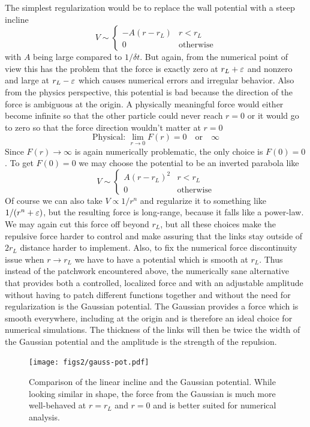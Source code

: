 \documentclass[endfloats,nofootinbib,preprint,floatfix,titlepage,superscriptaddress,linenumbers]{revtex4-1} %
\begin{document}
The simplest regularization would be to replace the wall potential with a steep incline
\[V \sim \begin{cases} -A(r -r_L) & r< r_L \\
0 & \mbox{otherwise} 
\end{cases}\]
with $A$ being large compared to $1/\delta t$. 
But again, from the numerical point of view this has the problem that the force is exactly zero at $r_L+\varepsilon$ and nonzero and large at $r_L - \varepsilon$ which causes numerical errors and irregular behavior. Also from the physics perspective, this potential is bad because the direction of the force is ambiguous at the origin. A physically meaningful force would either become infinite so that the other particle could never reach $r=0$ or it would go to zero so that the force direction wouldn't matter at $r=0$
\[\mbox{Physical: } \lim_{r\to 0} F(r) = 0 \quad \mbox{or}\quad \infty \]
Since $F(r)\to \infty$ is again numerically problematic, the only choice is $F(0) = 0$. To get $F(0) = 0$ we may choose the potential to be an inverted parabola like
\[V \sim \begin{cases} A(r -r_L)^2 & r< r_L \\
0 & \mbox{otherwise} 
\end{cases}\]
Of course we can also take $V\propto 1/r^n$ 
and regularize it to something like $1/(r^n+\varepsilon)$, but the resulting force is long-range, because it falls like a power-law. We may again cut this force off beyond $r_L$, but all these choices make the repulsive force harder to control and make assuring that the links stay outside of $2r_L$ distance harder to implement. 
Also, to fix the numerical force discontinuity issue when $r\to r_L$ we have to have a potential which is smooth at $r_L$. Thus instead of the patchwork encountered above, the numerically  sane 
alternative that provides both a controlled, localized force and with an adjustable amplitude without having to patch different functions together and without the need for regularization is the Gaussian potential. 
The Gaussian provides a force which is smooth everywhere, including at the origin and is therefore an ideal choice for numerical simulations. 
The thickness of the links will then be twice the width of the Gaussian potential and the amplitude is the strength of the repulsion.  

\begin{figure}
    \centering
    \texttt{[image: figs2/gauss-pot.pdf]}
    \caption{\scriptsize Comparison of the linear incline and the Gaussian potential. While looking similar in shape, the force from the Gaussian is much more well-behaved at $r= r_L$ and $r=0$ and is better suited for numerical analysis. }
    \label{fig:gauss}
\end{figure}
\end{document}
